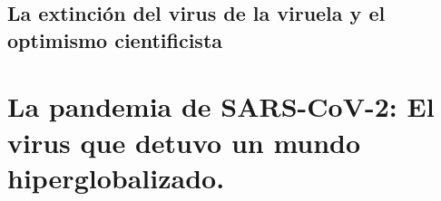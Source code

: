 \documentclass[
  spanish,
]{book}
\begin{document}
\hypertarget{la-extinciuxf3n-del-virus-de-la-viruela-y-el-optimismo-cientificista}{%
\section{La extinción del virus de la viruela y el optimismo cientificista}\label{la-extinciuxf3n-del-virus-de-la-viruela-y-el-optimismo-cientificista}}

\hypertarget{la-pandemia-de-sars-cov-2-el-virus-que-detuvo-un-mundo-hiperglobalizado.}{%
\chapter{La pandemia de SARS-CoV-2: El virus que detuvo un mundo hiperglobalizado.}\label{la-pandemia-de-sars-cov-2-el-virus-que-detuvo-un-mundo-hiperglobalizado.}}

  
\end{document}
